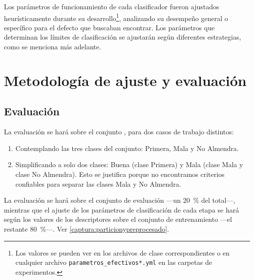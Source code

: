 Los parámetros de funcionamiento de cada clasificador fueron ajustados heurísticamente durante su desarrollo\footnote{Los valores se pueden ver en los archivos de clase correspondientes o en cualquier archivo \texttt{parametros\_efectivos*.yml} en las carpetas de experimentos.}, analizando su desempeño general o específico para el defecto que buscaban encontrar. Los parámetros que determinan los límites de clasificación se ajustarán según diferentes estrategias, como se menciona más adelante.





\section{Metodología de ajuste y evaluación}




\subsection{Evaluación}
La evaluación se hará sobre el conjunto , para dos casos de trabajo distintos:
\begin{enumerate}
\item Contemplando las tres clases del conjunto: Primera, Mala y No Almendra.
\item Simplificando a solo dos clases: Buena (clase Primera) y Mala (clase Mala y clase No Almendra). Esto se justifica porque no encontramos criterios confiables para separar las clases Mala y No Almendra.
\end{enumerate}

La evaluación se hará sobre el conjunto de evaluación —un \SI{20}{\percent} del total—, mientras que el ajuste de los parámetros de clasificación de cada etapa se hará según los valores de los descriptores sobre el conjunto de entrenamiento —el restante \SI{80}{\percent}—. Ver \ref{captura:particionypreprocesado}.

